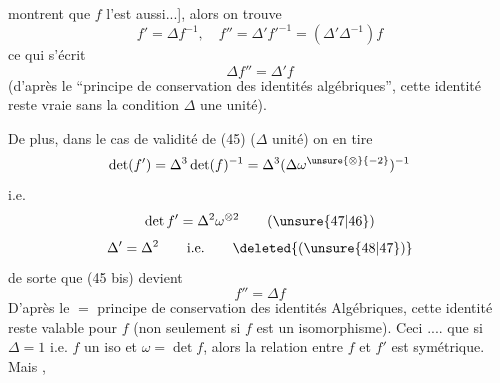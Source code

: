 montrent que $f$ l'est aussi...], alors  on trouve
\[
 f'=\Delta f^{-1},\quad f''=\Delta' f'^{-1}=(\Delta'\Delta^{-1})f \tag*{(45)}
\]
ce qui s'écrit
\[
 \Delta f''=\Delta' f \tag*{(45 bis)}
\]
(d'après le ``principe de conservation des identités algébriques'', cette  identité reste vraie sans la condition  $\Delta$ une unité).

De plus, dans le cas de validité de (45) ($\Delta$ unité) on en tire
\[
 \det(f')=\Delta^3\det(f)^{-1}=\Delta^3(\Delta\omega^{\unsure{\otimes}{-2}})^{-1}
\]
i.e.
\[
 \det f'=\Delta^2\omega^{\otimes2} \tag*{(\unsure{47|46})}
\]
\[
 \Delta'=\Delta^2\qquad\text{i.e.} \tag*{\deleted{(\unsure{48|47})}}
\]
 de sorte que (45 bis) devient
\[
 f''=\Delta f \tag*{(48)}
\]
D'après le $=$ principe de conservation des identités Algébriques, cette identité reste valable pour  $f$ (non seulement si $f$ est un isomorphisme). Ceci   .... que si $\Delta=1$ i.e. $f$ un iso et $\omega=\det f$, alors la relation entre $f$ et $f'$ est symétrique. Mais ,

